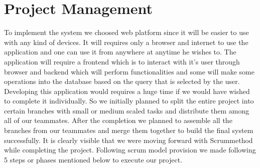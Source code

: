 \section{Project Management}\label{sec:projectmanagement}
To implement the system we choosed web platform since it will be easier to use with any kind of devices. It will requires only a browser and internet to use the application and one can use it from anywhere at anytime he wishes to. The application will require a frontend which is to interact with it's user through browser and backend which will perform functionalities and some will make some operations into the database based on the query that is selected by the user.\\
Developing this application would requires a huge time if we would have wished to complete it individually. So we initially planned to split the entire project into certain branches with small or medium scaled tasks and distribute them among all of our teammates. After the completion we planned to assemble all the branches from our teammates and merge them together to build the final system successfully. It is clearly visible that we were moving forward with Scrum\footnotemark method while completing the project. Following scrum model provision we made following 5 steps or phases mentioned below to execute our project. 
